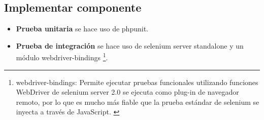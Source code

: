 \subsection{Implementar componente}

\begin{itemize}

\item \textbf{Prueba unitaria} se hace uso de phpunit.

\item \textbf{Prueba de integración} se hace uso de selenium server
standalone y un módulo webdriver-bindings \footnote{webdriver-bindings:
Permite ejecutar pruebas funcionales utilizando funciones WebDriver de
selenium server 2.0 se ejecuta como plug-in de navegador remoto,
por lo que es mucho más fiable que la prueba estándar de selenium se inyecta
a través de JavaScript. \cite{webdriverTest}}.

\end{itemize}


